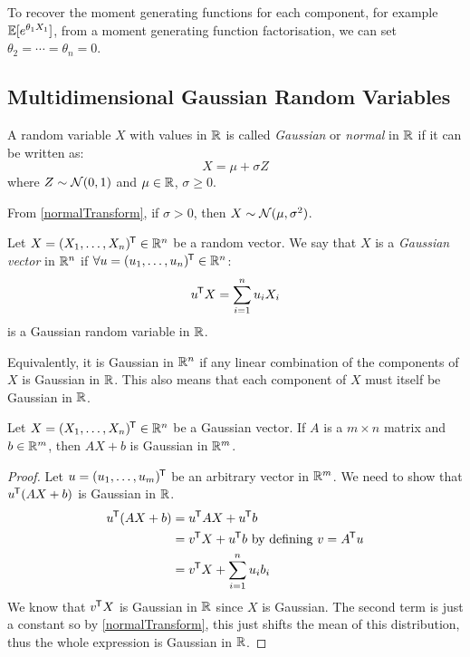 \documentclass[../main.tex]{subfiles}
\begin{document}
\begin{remark}
  To recover the moment generating functions for each component, for example $\mathbb{E}[e^{\theta_1 X_1}]$, from a moment generating function factorisation, we can set $\theta_2 = \cdots = \theta_n = 0$.
\end{remark}
\subsection{Multidimensional Gaussian Random Variables}
\begin{definition}[Gaussian in $\R$]
A random variable $X$ with values in $\R$ is called \textit{Gaussian} or \textit{normal} in $\R$ if it can be written as:
  \[
    X = \mu + \sigma Z
  \]
  where $Z \sim \operatorname{\mathcal{N}}(0, 1)$ and $\mu \in \mathbb{R}$, $\sigma \geq 0$.
\end{definition}
\begin{remark}[Note]
  From \cref{normalTransform}, if $\sigma > 0$, then $X \sim \operatorname{\mathcal{N}}(\mu, \sigma^2)$.
\end{remark}
\begin{definition}[Gaussian in $\R^n$]
  Let $X = (X_1, \ldots, X_n)^{{\mkern-1.5mu\mathsf{T}}} \in \mathbb{R}^{n}$ be a random vector.
  We say that $X$ is a \textit{Gaussian vector} in $\mathbb{R}^{n}$ if $\forall u = (u_1, \ldots, u_n)^{{\mkern-1.5mu\mathsf{T}}} \in \mathbb{R}^{n}$:
  \[
    u^{{\mkern-1.5mu\mathsf{T}}} X = \sum_{i = 1}^{n} u_i X_i
  \]
  is a Gaussian random variable in $\R$.
\end{definition}
\begin{remark}
  Equivalently, it is Gaussian in $\mathbb{R}^{n}$ if any linear combination of the components of $X$ is Gaussian in $\R$.
  This also means that each component of $X$ must itself be Gaussian in $\R$.
\end{remark}
\begin{proposition}
  Let $X = (X_1, \ldots, X_n)^{{\mkern-1.5mu\mathsf{T}}} \in \mathbb{R}^{n}$ be a Gaussian vector.
  If $A$ is a $m \times n$ matrix and $b \in \mathbb{R}^{m}$, then $AX + b$ is Gaussian in $\mathbb{R}^{m}$. \label{gaussianLinearTransform}
\end{proposition}
\begin{proof}
  Let $u = (u_1, \ldots, u_m)^{{\mkern-1.5mu\mathsf{T}}}$ be an arbitrary vector in $\mathbb{R}^{m}$.
  We need to show that $u^{{\mkern-1.5mu\mathsf{T}}}(AX + b)$ is Gaussian in $\R$.
  \begin{align*}
    u^{{\mkern-1.5mu\mathsf{T}}}(AX + b) &= u^{{\mkern-1.5mu\mathsf{T}}}AX + u^{{\mkern-1.5mu\mathsf{T}}}b \\
                       &= v^{{\mkern-1.5mu\mathsf{T}}} X + u^{{\mkern-1.5mu\mathsf{T}}}b \text{ by defining $v = A^{{\mkern-1.5mu\mathsf{T}}}u$} \\
                       &= v^{{\mkern-1.5mu\mathsf{T}}} X + \sum_{i = 1}^{n} u_ib_i
  \end{align*}
  We know that $v^{{\mkern-1.5mu\mathsf{T}}}X$ is Gaussian in $\R$ since $X$ is Gaussian.
  The second term is just a constant so by \cref{normalTransform}, this just shifts the mean of this distribution, thus the whole expression is Gaussian in $\R$.
\end{proof}
\end{document}
